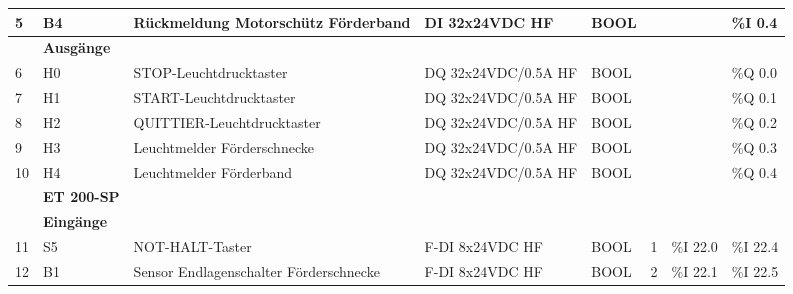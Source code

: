 \begin{table}[H]
\begin{longtable}{|llllllll|}
        \multicolumn{1}{|l|}{5} & \multicolumn{1}{l|}{B4} & \multicolumn{1}{l|}{Rückmeldung Motorschütz Förderband} & \multicolumn{1}{l|}{DI 32x24VDC HF} & \multicolumn{1}{l|}{BOOL} & \multicolumn{1}{l|}{} & \multicolumn{1}{l|}{} & \%I 0.4 \\ \hline
        \rowcolor{lightGrey}
        & \multicolumn{7}{l|}{\textbf{Ausgänge}} \\ \hline
        \multicolumn{1}{|l|}{6} & \multicolumn{1}{l|}{H0} & \multicolumn{1}{l|}{STOP-Leuchtdrucktaster} & \multicolumn{1}{l|}{DQ 32x24VDC/0.5A HF} & \multicolumn{1}{l|}{BOOL} & \multicolumn{1}{l|}{}      & \multicolumn{1}{l|}{} & \%Q 0.0 \\
        \multicolumn{1}{|l|}{7} & \multicolumn{1}{l|}{H1} & \multicolumn{1}{l|}{START-Leuchtdrucktaster} & \multicolumn{1}{l|}{DQ 32x24VDC/0.5A HF} & \multicolumn{1}{l|}{BOOL} & \multicolumn{1}{l|}{}      & \multicolumn{1}{l|}{} & \%Q 0.1 \\
        \multicolumn{1}{|l|}{8} & \multicolumn{1}{l|}{H2} & \multicolumn{1}{l|}{QUITTIER-Leuchtdrucktaster} & \multicolumn{1}{l|}{DQ 32x24VDC/0.5A HF} & \multicolumn{1}{l|}{BOOL} & \multicolumn{1}{l|}{} & \multicolumn{1}{l|}{} & \%Q 0.2 \\
        \multicolumn{1}{|l|}{9} & \multicolumn{1}{l|}{H3} & \multicolumn{1}{l|}{Leuchtmelder Förderschnecke} & \multicolumn{1}{l|}{DQ 32x24VDC/0.5A HF} & \multicolumn{1}{l|}{BOOL} & \multicolumn{1}{l|}{} & \multicolumn{1}{l|}{} & \%Q 0.3 \\
        \multicolumn{1}{|l|}{10} & \multicolumn{1}{l|}{H4} & \multicolumn{1}{l|}{Leuchtmelder Förderband} & \multicolumn{1}{l|}{DQ 32x24VDC/0.5A HF} & \multicolumn{1}{l|}{BOOL} & \multicolumn{1}{l|}{}      & \multicolumn{1}{l|}{} & \%Q 0.4 \\ \hline
        \rowcolor{grey}
        \multicolumn{3}{|l}{} & \textbf{ET 200-SP} & \multicolumn{4}{l|}{} \\ \hline
        \rowcolor{lightGrey}
        & \multicolumn{7}{l|}{\textbf{Eingänge}} \\ \hline
        \multicolumn{1}{|l|}{11} & \multicolumn{1}{l|}{S5} & \multicolumn{1}{l|}{NOT-HALT-Taster} & \multicolumn{1}{l|}{F-DI 8x24VDC HF} & \multicolumn{1}{l|}{BOOL} & \multicolumn{1}{l|}{1}     & \multicolumn{1}{l|}{\%I 22.0} & \%I 22.4 \\
        \multicolumn{1}{|l|}{12} & \multicolumn{1}{l|}{B1} & \multicolumn{1}{l|}{Sensor Endlagenschalter Förderschnecke} & \multicolumn{1}{l|}{F-DI 8x24VDC HF} & \multicolumn{1}{l|}{BOOL} & \multicolumn{1}{l|}{2} & \multicolumn{1}{l|}{\%I 22.1} & \%I 22.5 \\

\end{longtable}
\end{table}
